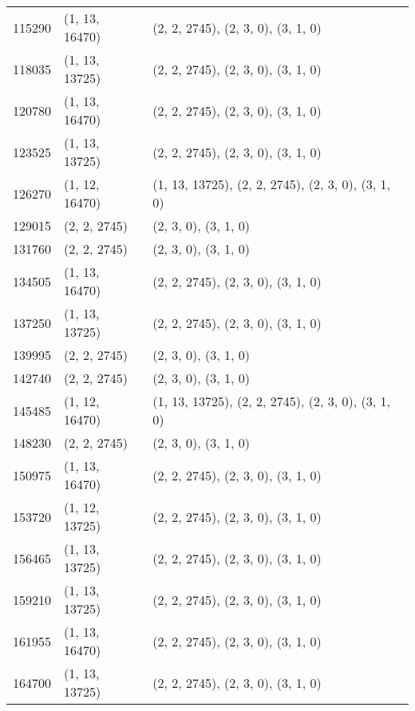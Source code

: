 \begin{longtable}{@{\extracolsep{\fill}}lll}
    115290             & (1, 13, 16470)              & (2, 2, 2745), (2, 3, 0), (3, 1, 0)                  \\
    118035             & (1, 13, 13725)              & (2, 2, 2745), (2, 3, 0), (3, 1, 0)                  \\
    120780             & (1, 13, 16470)              & (2, 2, 2745), (2, 3, 0), (3, 1, 0)                  \\
    123525             & (1, 13, 13725)              & (2, 2, 2745), (2, 3, 0), (3, 1, 0)                  \\
    126270             & (1, 12, 16470)              & (1, 13, 13725), (2, 2, 2745), (2, 3, 0), (3, 1, 0)  \\
    129015             & (2, 2, 2745)                & (2, 3, 0), (3, 1, 0)                                \\
    131760             & (2, 2, 2745)                & (2, 3, 0), (3, 1, 0)                                \\
    134505             & (1, 13, 16470)              & (2, 2, 2745), (2, 3, 0), (3, 1, 0)                  \\
    137250             & (1, 13, 13725)              & (2, 2, 2745), (2, 3, 0), (3, 1, 0)                  \\
    139995             & (2, 2, 2745)                & (2, 3, 0), (3, 1, 0)                                \\
    142740             & (2, 2, 2745)                & (2, 3, 0), (3, 1, 0)                                \\
    145485             & (1, 12, 16470)              & (1, 13, 13725), (2, 2, 2745), (2, 3, 0), (3, 1, 0)  \\
    148230             & (2, 2, 2745)                & (2, 3, 0), (3, 1, 0)                                \\
    150975             & (1, 13, 16470)              & (2, 2, 2745), (2, 3, 0), (3, 1, 0)                  \\
    153720             & (1, 12, 13725)              & (2, 2, 2745), (2, 3, 0), (3, 1, 0)                  \\
    156465             & (1, 13, 13725)              & (2, 2, 2745), (2, 3, 0), (3, 1, 0)                  \\
    159210             & (1, 13, 13725)              & (2, 2, 2745), (2, 3, 0), (3, 1, 0)                  \\
    161955             & (1, 13, 16470)              & (2, 2, 2745), (2, 3, 0), (3, 1, 0)                  \\
    164700             & (1, 13, 13725)              & (2, 2, 2745), (2, 3, 0), (3, 1, 0)                  \\
\end{longtable}

